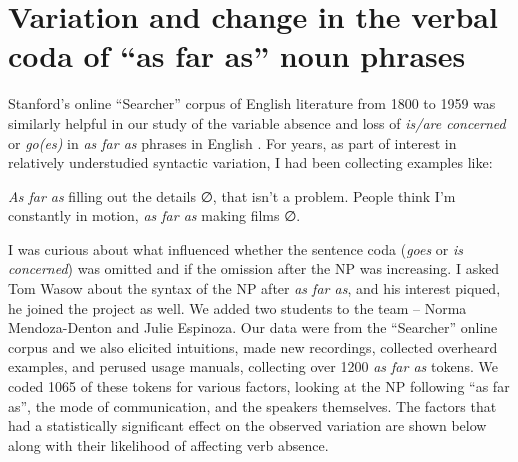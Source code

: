 \documentclass[output=paper,colorlinks,citecolor=brown]{langscibook}
\begin{document}
\section{Variation and change in the verbal coda of {“as far as”} noun phrases}
Stanford’s online “Searcher” corpus of English literature from 1800 to 1959 was similarly helpful in our study of the variable absence and loss of \textit{is/are concerned} or \textit{go(es)} in \textit{as far as} phrases in English \citep{RickfordEspinoza1995}. For years, as part of interest in relatively understudied syntactic variation, I had been collecting examples like:

\ea\label{ex 1:rickford:1} 
\textit{As far as} filling out the details ∅, that isn’t a problem.
\ex\label{ex 2:rickford:2} 
People think I’m constantly in motion, \textit{as far as} making films ∅.
\z

I was curious about what influenced whether the sentence coda (\textit{goes} or \textit{is concerned}) was omitted and if the omission after the NP was increasing.  I asked Tom Wasow about the syntax of the NP after \textit{as far as}, and his interest piqued, he joined the project as well. We added two students to the team -- Norma Mendoza-Denton and Julie Espinoza.  Our data were from the “Searcher” online corpus and we also elicited intuitions, made new recordings, collected overheard examples, and perused usage manuals, collecting over 1200 \textit{as far as} tokens. We coded 1065 of these tokens for various factors, looking at the NP following “as far as”, the mode of communication, and the speakers themselves. The factors that had a statistically significant effect on the observed variation are shown below along with their likelihood of affecting verb absence.  
\end{document}
